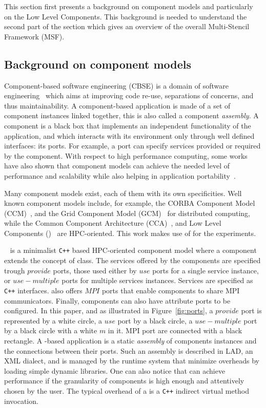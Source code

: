 This section first presents a background on component models and particularly on the Low Level Components. This background is needed to understand the second part of the section which gives an overview of the overall Multi-Stencil Framework (MSF).

\subsection{Background on component models}
Component-based software engineering (CBSE) is a domain of software engineering~\cite{Szyperski:2002:CSB:515228} which aims at improving code re-use, separations of concerns, and thus maintainability.
A component-based application is made of a set of component instances linked together, this is also called a component \emph{assembly}.
A component is a black box that implements an independent functionality of the application, and which interacts with its environment only through well defined interfaces: its ports.
For example, a port can specify services provided or required by the component.
With respect to high performance computing, some works have also shown
that component models can achieve the needed level of performance and
scalability while also helping in application portability~\cite{Bernholdt01052006, bigot:inria-00388508, UCHPC2015}.

Many component models exist, each of them with its own specificities.
Well known component models include, for example, the CORBA Component Model (CCM)~\cite{corba:omg06}, and the Grid Component Model (GCM)~\cite{Baude} for distributed computing, while the Common Component Architecture (CCA)~\cite{Bernholdt01052006}, and Low Level Components (\llc)~\cite{l2c} are HPC-oriented.
This work makes use of \llc for the experiments.

\llc~\cite{l2c} is a minimalist \texttt{C++} based HPC-oriented component model
where a component extends the concept of class.
The services offered by the components are specified trough $provide$ ports,
those used either by $use$ ports for a single service instance,
or $use-multiple$ ports for multiple services instances.
Services are specified as \texttt{C++} interfaces.
\llc also offers $MPI$ ports that enable components to share MPI communicators. Finally, 
components can also have attribute ports to be configured.
%
In this paper, and as illustrated in Figure~\ref{fig:ports}, a $provide$ port is represented by a white circle, a $use$ port by a black circle, a $use-multiple$ port by a black circle with a white $m$ in it. MPI port are connected with a black rectangle. A \llc-based application is a static \emph{assembly} of components instances and the connections between their ports.
Such an assembly is described in LAD, an XML dialect, and is managed by the \llc runtime system that minimize overheads by loading simple dynamic libraries. One can also notice that \llc can achieve performance if the granularity of components is high enough and attentively chosen by the user. The typical overhead of a \llc is a \texttt{C++} indirect virtual method invocation.

